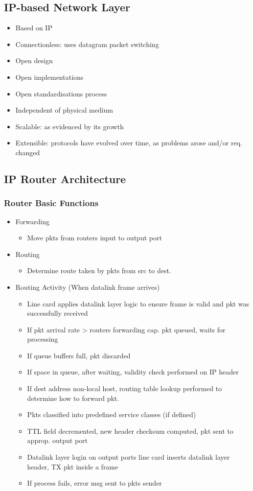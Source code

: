 \documentclass[a4paper]{article}
\begin{document}
\subsection{IP-based Network Layer}
\begin{itemize}
	\item Based on IP
	\item Connectionless: uses datagram packet switching
	\item Open design
	\item Open implementations
	\item Open standardisations process
	\item Independent of physical medium
	\item Scalable: as evidenced by its growth
	\item Extensible: protocols have evolved over time, as problems arose
		and/or req. changed
\end{itemize}
\subsection{IP Router Architecture}
\subsubsection{Router Basic Functions}
\begin{itemize}
	\item Forwarding
	\begin{itemize}
		\item Move pkts from routers input to output port
	\end{itemize}
	\item Routing
	\begin{itemize}
		\item Determine route taken by pkts from src to dest.
	\end{itemize}
	\item Routing Activity (When datalink frame arrives)
	\begin{itemize}
		\item Line card applies datalink layer logic to ensure frame is
			valid and pkt was successfully received
		\item If pkt arrival rate > routers forwarding cap. pkt queued,
			waits for processing
		\item If queue buffers full, pkt discarded
		\item If space in queue, after waiting, validity check performed
			on IP header
		\item If dest address non-local host, routing table lookup
			performed to determine how to forward pkt.
		\item Pkts classified into predefined service classes (if
			defined)
		\item TTL field decremented, new header checksum computed, pkt
			sent to approp. output port
		\item Datalink layer login on output ports line card inserts
			datalink layer header, TX pkt inside a frame
		\item If process fails, error msg sent to pkts sender
	\end{itemize}
\end{itemize}
\end{document}

